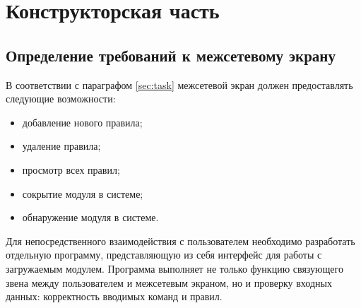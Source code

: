 \section{Конструкторская часть}

\subsection{Определение требований к межсетевому экрану}
В соответствии с параграфом \ref{sec:task} межсетевой экран должен предоставлять следующие возможности:
\begin{itemize}
	\item добавление нового правила;

	\item удаление правила;
	
	\item просмотр всех правил;
	
	\item сокрытие модуля в системе;
	
	\item обнаружение модуля в системе. \\
\end{itemize}

Для непосредственного взаимодействия с пользователем необходимо разработать отдельную программу, представляющую из себя интерфейс для работы с загружаемым модулем. Программа выполняет не только функцию связующего звена между пользователем и межсетевым экраном, но и проверку входных данных: корректность вводимых команд и правил. \\

